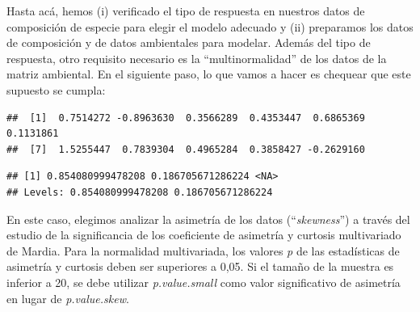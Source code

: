 \documentclass[
]{book}
\newenvironment{Shaded}{\begin{snugshade}}{\end{snugshade}}
\newcommand{\AttributeTok}[1]{\textcolor[rgb]{0.77,0.63,0.00}{#1}}
\newcommand{\CommentTok}[1]{\textcolor[rgb]{0.56,0.35,0.01}{\textit{#1}}}
\newcommand{\FunctionTok}[1]{\textcolor[rgb]{0.00,0.00,0.00}{#1}}
\newcommand{\NormalTok}[1]{#1}
\newcommand{\OtherTok}[1]{\textcolor[rgb]{0.56,0.35,0.01}{#1}}
\newcommand{\SpecialCharTok}[1]{\textcolor[rgb]{0.00,0.00,0.00}{#1}}
\newcommand{\StringTok}[1]{\textcolor[rgb]{0.31,0.60,0.02}{#1}}
\begin{document}
Hasta acá, hemos (i) verificado el tipo de respuesta en nuestros datos de composición de especie para elegir el modelo adecuado y (ii) preparamos los datos de composición y de datos ambientales para modelar.
Además del tipo de respuesta, otro requisito necesario es la ``multinormalidad'' de los datos de la matriz ambiental. En el siguiente paso, lo que vamos a hacer es chequear que este supuesto se cumpla:

\begin{Shaded}
\end{Shaded}

\begin{verbatim}
##  [1]  0.7514272 -0.8963630  0.3566289  0.4353447  0.6865369  0.1131861
##  [7]  1.5255447  0.7839304  0.4965284  0.3858427 -0.2629160
\end{verbatim}

\begin{Shaded}
\end{Shaded}

\begin{verbatim}
## [1] 0.854080999478208 0.186705671286224 <NA>             
## Levels: 0.854080999478208 0.186705671286224
\end{verbatim}

En este caso, elegimos analizar la asimetría de los datos (``\emph{skewness}'') a través del estudio de la significancia de los coeficiente de asimetría y curtosis multivariado de Mardia. Para la normalidad multivariada, los valores \emph{p} de las estadísticas de asimetría y curtosis deben ser superiores a 0,05. Si el tamaño de la muestra es inferior a 20, se debe utilizar \emph{p.value.small} como valor significativo de asimetría en lugar de \emph{p.value.skew}.
\end{document}
